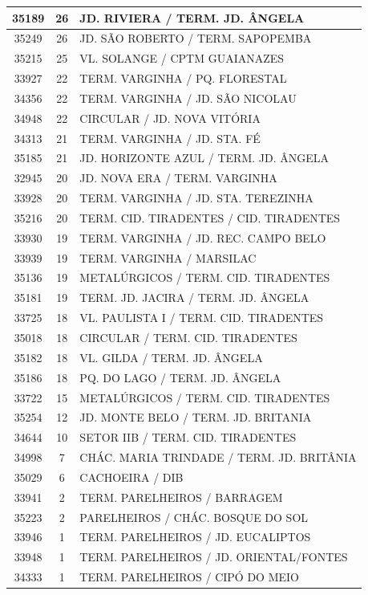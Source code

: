 \documentclass[
	12pt,				%
	oneside,			%
	a4paper,			%
	english,			%
	brazil				%
	]{abntex2ppgsi}
\begin{document}
{{{\begin{apendicesenv}
\begin{longtable}{c|c|p{7cm}}
35189 &	26 &	JD. RIVIERA / TERM. JD. ÂNGELA \\ 
 \hline 
35249 &	26 &	JD. SÃO ROBERTO / TERM. SAPOPEMBA \\ 
 \hline 
35215 &	25 &	VL. SOLANGE / CPTM GUAIANAZES \\ 
 \hline 
33927 &	22 &	TERM. VARGINHA / PQ. FLORESTAL \\ 
 \hline 
34356 &	22 &	TERM. VARGINHA / JD. SÃO NICOLAU \\ 
 \hline 
34948 &	22 &	CIRCULAR / JD. NOVA VITÓRIA \\ 
 \hline 
34313 &	21 &	TERM. VARGINHA / JD. STA. FÉ \\ 
 \hline 
35185 &	21 &	JD. HORIZONTE AZUL / TERM. JD. ÂNGELA \\ 
 \hline 
32945 &	20 &	JD. NOVA ERA / TERM. VARGINHA \\ 
 \hline 
33928 &	20 &	TERM. VARGINHA / JD. STA. TEREZINHA \\ 
 \hline 
35216 &	20 &	TERM. CID. TIRADENTES / CID. TIRADENTES \\ 
 \hline 
33930 &	19 &	TERM. VARGINHA / JD. REC. CAMPO BELO \\ 
 \hline 
33939 &	19 &	TERM. VARGINHA / MARSILAC \\ 
 \hline 
35136 &	19 &	METALÚRGICOS / TERM. CID. TIRADENTES \\ 
 \hline 
35181 &	19 &	TERM. JD. JACIRA / TERM. JD. ÂNGELA \\ 
 \hline 
33725 &	18 &	VL. PAULISTA I / TERM. CID. TIRADENTES \\ 
 \hline 
35018 &	18 &	CIRCULAR / TERM. CID. TIRADENTES \\ 
 \hline 
35182 &	18 &	VL. GILDA / TERM. JD. ÂNGELA \\ 
 \hline 
35186 &	18 &	PQ. DO LAGO / TERM. JD. ÂNGELA \\ 
 \hline 
33722 &	15 &	METALÚRGICOS / TERM. CID. TIRADENTES \\ 
 \hline 
35254 &	12 &	JD. MONTE BELO / TERM. JD. BRITANIA \\ 
 \hline 
34644 &	10 &	SETOR IIB / TERM. CID. TIRADENTES \\ 
 \hline 
34998 &	7 &	CHÁC. MARIA TRINDADE / TERM. JD. BRITÂNIA \\ 
 \hline 
35029 &	6 &	CACHOEIRA / DIB \\ 
 \hline 
33941 &	2 &	TERM. PARELHEIROS / BARRAGEM \\ 
 \hline 
35223 &	2 &	PARELHEIROS / CHÁC. BOSQUE DO SOL \\ 
 \hline 
33946 &	1 &	TERM. PARELHEIROS / JD. EUCALIPTOS \\ 
 \hline 
33948 &	1 &	TERM. PARELHEIROS / JD. ORIENTAL/FONTES \\ 
 \hline 
34333 &	1 &	TERM. PARELHEIROS / CIPÓ DO MEIO \\
\hline


\end{longtable}
\end{apendicesenv}}}}
\end{document}
